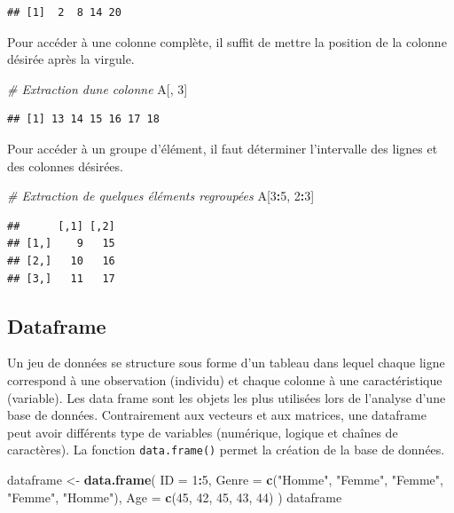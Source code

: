 \documentclass[
]{book}
\newenvironment{Shaded}{\begin{snugshade}}{\end{snugshade}}
\newcommand{\AttributeTok}[1]{\textcolor[rgb]{0.13,0.29,0.53}{#1}}
\newcommand{\CommentTok}[1]{\textcolor[rgb]{0.56,0.35,0.01}{\textit{#1}}}
\newcommand{\DecValTok}[1]{\textcolor[rgb]{0.00,0.00,0.81}{#1}}
\newcommand{\FunctionTok}[1]{\textcolor[rgb]{0.13,0.29,0.53}{\textbf{#1}}}
\newcommand{\NormalTok}[1]{#1}
\newcommand{\OtherTok}[1]{\textcolor[rgb]{0.56,0.35,0.01}{#1}}
\newcommand{\SpecialCharTok}[1]{\textcolor[rgb]{0.81,0.36,0.00}{\textbf{#1}}}
\newcommand{\StringTok}[1]{\textcolor[rgb]{0.31,0.60,0.02}{#1}}
\begin{document}
\begin{verbatim}
## [1]  2  8 14 20
\end{verbatim}

Pour accéder à une colonne complète, il suffit de mettre la position de la colonne désirée après la virgule.

\begin{Shaded}
\begin{Highlighting}[]
\CommentTok{\# Extraction d\textquotesingle{}une colonne}
\NormalTok{A[, }\DecValTok{3}\NormalTok{]}
\end{Highlighting}
\end{Shaded}

\begin{verbatim}
## [1] 13 14 15 16 17 18
\end{verbatim}

Pour accéder à un groupe d'élément, il faut déterminer l'intervalle des lignes et des colonnes désirées.

\begin{Shaded}
\begin{Highlighting}[]
\CommentTok{\# Extraction de quelques éléments regroupées}
\NormalTok{A[}\DecValTok{3}\SpecialCharTok{:}\DecValTok{5}\NormalTok{, }\DecValTok{2}\SpecialCharTok{:}\DecValTok{3}\NormalTok{]}
\end{Highlighting}
\end{Shaded}

\begin{verbatim}
##      [,1] [,2]
## [1,]    9   15
## [2,]   10   16
## [3,]   11   17
\end{verbatim}

\subsection{Dataframe}\label{dataframe}

Un jeu de données se structure sous forme d'un tableau dans lequel chaque ligne correspond à une observation (individu) et chaque colonne à une caractéristique (variable). Les data frame sont les objets les plus utilisées lors de l'analyse d'une base de données. Contrairement aux vecteurs et aux matrices, une dataframe peut avoir différents type de variables (numérique, logique et chaînes de caractères). La fonction \texttt{data.frame()} permet la création de la base de données.

\begin{Shaded}
\begin{Highlighting}[]
\NormalTok{dataframe }\OtherTok{\textless{}{-}} \FunctionTok{data.frame}\NormalTok{(}
  \AttributeTok{ID =} \DecValTok{1}\SpecialCharTok{:}\DecValTok{5}\NormalTok{,}
  \AttributeTok{Genre =} \FunctionTok{c}\NormalTok{(}\StringTok{"Homme"}\NormalTok{, }\StringTok{"Femme"}\NormalTok{, }\StringTok{"Femme"}\NormalTok{, }\StringTok{"Femme"}\NormalTok{, }\StringTok{"Homme"}\NormalTok{),}
  \AttributeTok{Age =} \FunctionTok{c}\NormalTok{(}\DecValTok{45}\NormalTok{, }\DecValTok{42}\NormalTok{, }\DecValTok{45}\NormalTok{, }\DecValTok{43}\NormalTok{, }\DecValTok{44}\NormalTok{)}
\NormalTok{)}
\NormalTok{dataframe}
\end{Highlighting}
\end{Shaded}
\end{document}
